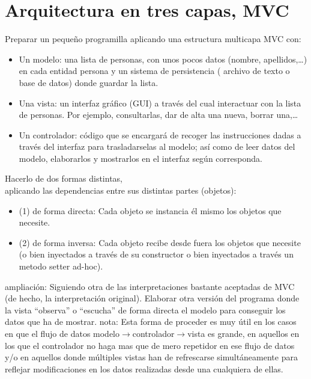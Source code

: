 \documentclass[spanish,12pt,a4paper,final,oneside]{book}
\begin{document}
\section{Arquitectura en tres capas, MVC}\label{ejercicio_mvc}
Preparar un pequeño programilla aplicando una estructura multicapa MVC con:
\begin{itemize}

\item Un modelo: una lista de personas, con unos pocos datos (nombre, apellidos,\ldots) en cada entidad persona y un sistema de persistencia (  archivo de texto o base de datos) donde guardar la lista.

\item Una vista: un interfaz gráfico (GUI) a través del cual interactuar con la lista de personas. Por ejemplo, consultarlas, dar de alta una nueva, borrar una,\ldots

\item Un controlador: código que se encargará de recoger las instrucciones dadas a través del interfaz para trasladarselas al modelo; así como de leer datos del modelo, elaborarlos y mostrarlos en el interfaz según corresponda.

\end{itemize}

Hacerlo de dos formas distintas,
\\aplicando las dependencias entre sus distintas partes (objetos):
\begin{itemize}

\item (1) de forma directa: Cada objeto se instancia él mismo los objetos que necesite.

\item (2) de forma inversa: Cada objeto recibe desde fuera los objetos que necesite \footnotesize{(o bien inyectados a través de su constructor o bien inyectados a través un metodo setter ad-hoc)}.

\end{itemize}

ampliación: Siguiendo otra de las interpretaciones bastante aceptadas de MVC (de hecho, la interpretación original). Elaborar otra versión del programa donde la vista ``observa'' o ``escucha'' de forma directa el modelo para conseguir los datos que ha de mostrar. nota: Esta forma de proceder es muy útil en los casos en que el flujo de datos modelo$\rightarrow$controlador$\rightarrow$vista es grande, en aquellos en los que el controlador no haga mas que de mero repetidor en ese flujo de datos y/o en aquellos donde múltiples vistas han de refrescarse simultáneamente para reflejar modificaciones en los datos realizadas desde una cualquiera de ellas.
\end{document}
